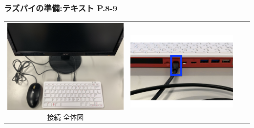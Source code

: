 \documentclass[dvipdfmx]{beamer}
\begin{document}
\begin{frame}[fragile]
	\frametitle{ラズパイの準備:テキスト P.8-9~~~}

	\begin{tabular}{cccc}
		\begin{minipage}{0.23\textwidth}
    {\upshape
      \includegraphics[width=\textwidth]{connections01-2023.jpg}
      \newline
			接続 全体図}
			\end{minipage} &
			\begin{minipage}{0.23\textwidth}
                    {\upshape
                      \includegraphics[width=\textwidth]{figure222023.pdf}
}
\end{minipage}
\end{tabular}
\end{frame}
\end{document}
